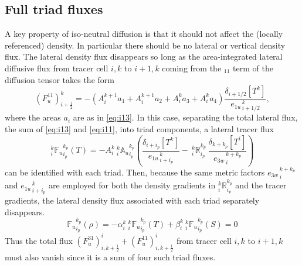 \documentclass[../main/NEMO_manual]{subfiles}
\begin{document}
\subsection{Full triad fluxes}

A key property of iso-neutral diffusion is that it should not affect the (locally referenced) density.
In particular there should be no lateral or vertical density flux.
The lateral density flux disappears so long as the area-integrated lateral diffusive flux from
tracer cell $i,k$ to $i+1,k$ coming from the $_{11}$ term of the diffusion tensor takes the form
\begin{equation}
  \label{eq:i11}
  \left( F_u^{11} \right) _{i+\frac{1}{2}} ^{k} =
  - \left( {A}_i^{k+1} a_{1} + {A}_i^{k+1} a_{2} + {A}_i^k
    a_{3} + {A}_i^k a_{4} \right)
  \frac{\delta_{i+1/2} \left[ T^k\right]}{{e_{1u}}_{\,i+1/2}^{\,k}},
\end{equation}
where the areas $a_i$ are as in \autoref{eq:i13}.
In this case, separating the total lateral flux, the sum of \autoref{eq:i13} and \autoref{eq:i11},
into triad components, a lateral tracer flux
\begin{equation}
  \label{eq:latflux-triad}
  _i^k {\mathbb{F}_u}_{i_p}^{k_p} (T) = - {A}_i^k{ \:}_i^k{\mathbb{A}_u}_{i_p}^{k_p}
  \left(
    \frac{ \delta_{i+ i_p}[T^k] }{ {e_{1u}}_{\,i + i_p}^{\,k} }
    -\ {_i^k\mathbb{R}_{i_p}^{k_p}} \
    \frac{ \delta_{k+k_p} [T^i] }{{e_{3w}}_{\,i}^{\,k+k_p} }
  \right)
\end{equation}
can be identified with each triad.
Then, because the same metric factors ${e_{3w}}_{\,i}^{\,k+k_p}$ and ${e_{1u}}_{\,i+i_p}^{\,k}$ are employed for both
the density gradients in $ _i^k \mathbb{R}_{i_p}^{k_p}$ and the tracer gradients,
the lateral density flux associated with each triad separately disappears.
\begin{equation}
  \label{eq:latflux-rho}
  {\mathbb{F}_u}_{i_p}^{k_p} (\rho)=-\alpha _i^k {\:}_i^k {\mathbb{F}_u}_{i_p}^{k_p} (T) + \beta_i^k {\:}_i^k {\mathbb{F}_u}_{i_p}^{k_p} (S)=0
\end{equation}
Thus the total flux $\left( F_u^{31} \right) ^i _{i,k+\frac{1}{2}} + \left( F_u^{11} \right) ^i _{i,k+\frac{1}{2}}$ from
tracer cell $i,k$ to $i+1,k$ must also vanish since it is a sum of four such triad fluxes.
\end{document}
